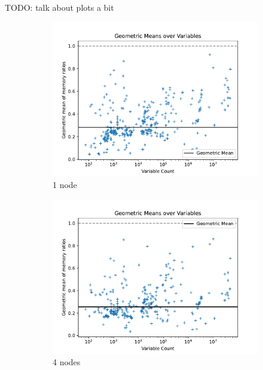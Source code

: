 \documentclass[12pt,a4paper,twoside]{scrartcl}
\numberwithin{equation}{section}
\begin{document}
TODO: talk about plots a bit

\begin{figure}
  \center
  \begin{subfigure}[c]{.45\textwidth}
    \center
    \includegraphics[scale=.45]{plots/1node_compare/mem_gm_over_vars.pdf}
    \caption{1 node}
  \end{subfigure}
  \begin{subfigure}[c]{.45\textwidth}
    \center
    \includegraphics[scale=.45]{plots/4node_compare/mem_gm_over_vars.pdf}
    \caption{4 nodes}
  \end{subfigure}
  \begin{subfigure}[c]{.45\textwidth}
    \center

\end{subfigure}
\end{figure}
\end{document}
